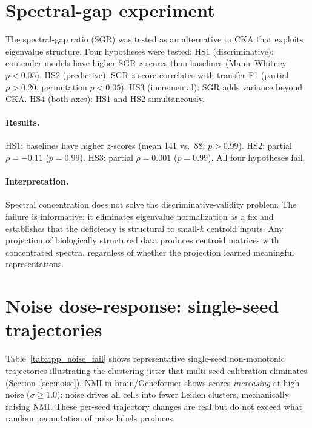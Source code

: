 \documentclass[11pt]{article}
\begin{document}
\section{Spectral-gap experiment}
\label{app:spectral}

The spectral-gap ratio (SGR) was tested as an alternative to CKA that
exploits eigenvalue structure. Four hypotheses were tested: HS1
(discriminative): contender models have higher SGR $z$-scores than
baselines (Mann--Whitney $p < 0.05$). HS2 (predictive): SGR $z$-score
correlates with transfer F1 (partial $\rho > 0.20$, permutation
$p < 0.05$). HS3 (incremental): SGR adds variance beyond CKA. HS4
(both axes): HS1 and HS2 simultaneously.

\paragraph{Results.} HS1: baselines have higher $z$-scores (mean 141
vs.\ 88; $p > 0.99$). HS2: partial $\rho = -0.11$ ($p = 0.99$). HS3:
partial $\rho = 0.001$ ($p = 0.99$). All four hypotheses fail.

\paragraph{Interpretation.} Spectral concentration does not solve the
discriminative-validity problem. The failure is informative: it
eliminates eigenvalue normalization as a fix and establishes that the
deficiency is structural to small-$k$ centroid inputs. Any projection
of biologically structured data produces centroid matrices with
concentrated spectra, regardless of whether the projection learned
meaningful representations.


\section{Noise dose-response: single-seed trajectories}
\label{app:noise}

Table~\ref{tab:app_noise_fail} shows representative single-seed
non-monotonic trajectories illustrating the clustering jitter that
multi-seed calibration eliminates (Section~\ref{sec:noise}). NMI in
brain/Geneformer shows scores \emph{increasing} at high noise
($\sigma \geq 1.0$): noise drives all cells into fewer Leiden clusters,
mechanically raising NMI. These per-seed trajectory changes are real but
do not exceed what random permutation of noise labels produces.
\end{document}
